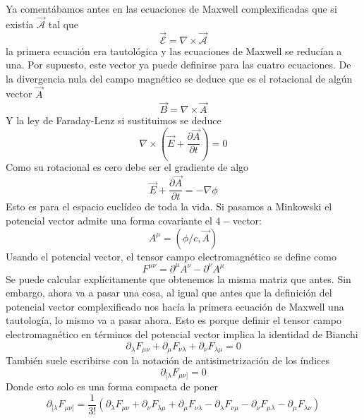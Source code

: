 \documentclass[12pt]{article}
\begin{document}
Ya comentábamos antes en las ecuaciones de Maxwell complexificadas que si existía $\vec {\mathcal{A}}$ tal que 
\begin{equation}
    \vec{\mathcal{E}}= \nabla \times \vec {\mathcal{A}}
\end{equation} 
la primera ecuación era tautológica y las ecuaciones de Maxwell se reducían a una. Por supuesto, este vector ya puede definirse para las cuatro ecuaciones. De la divergencia nula del campo magnético se deduce que es el rotacional de algún vector $\vec A$ 
\begin{equation}
    \vec B =\nabla \times \vec A
\end{equation}
Y la ley de Faraday-Lenz si sustituimos se deduce
\begin{equation}
    \nabla \times \left( \vec E +\frac{\partial \vec A}{\partial t}\right) =0
\end{equation}
Como su rotacional es cero debe ser el gradiente de algo 
\begin{equation}
    \vec E+ \frac{\partial \vec A}{\partial t}=-\nabla \phi 
\end{equation}
Esto es para el espacio euclídeo de toda la vida. Si pasamos a Minkowski el potencial vector admite una forma covariante el $4-$vector:
\begin{equation}
    A^\mu =(\phi/c, \vec A)
\end{equation}
Usando el potencial vector, el tensor campo electromagnético se define como
\begin{equation}
    F^{\mu \nu}= \partial^\mu A^\nu -\partial^\nu A^\mu 
\end{equation}
Se puede calcular explícitamente que obtenemos la misma matriz que antes. Sin embargo, ahora va a pasar una cosa, al igual que antes que la definición del potencial vector complexificado nos hacía la primera ecuación de Maxwell una tautología, lo mismo va a pasar ahora. Esto es porque  definir el tensor campo electromagnético en términos del potencial vector implica la identidad de Bianchi 
\begin{equation}
    \partial_\lambda F_{\mu \nu}+\partial_\mu F_{\nu \lambda}+ \partial_\nu F_{\lambda \mu}=0
\end{equation}
También suele escribirse con la notación de antisimetrización de los índices  
\begin{equation}
    \partial_{[\lambda} F_{\mu \nu]} = 0
\end{equation} 
Donde esto solo es una forma compacta de poner 
\begin{equation}
    \partial_{[\lambda} F_{\mu \nu]} =\frac{1}{3!}\left(\partial_\lambda F_{\mu \nu}+\partial_\nu F_{\lambda \mu}+ \partial_\mu F_{\nu \lambda}-\partial_\lambda F_{\nu \mu}-\partial_\nu F_{\mu \lambda}-\partial_\mu F_{\lambda \nu} 
    \right)
\end{equation}
\end{document}
